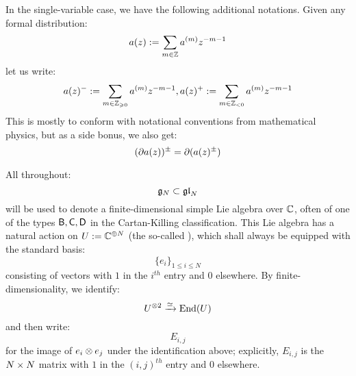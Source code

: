             In the single-variable case, we have the following additional notations. Given any formal distribution:
                $$a(z) := \sum_{m \in \mathbb{Z}} a^{(m)} z^{-m - 1}$$
            let us write:
                $$a(z)^- := \sum_{m \in \mathbb{Z}_{\geqslant 0}} a^{(m)} z^{-m - 1}, a(z)^+ := \sum_{m \in \mathbb{Z}_{< 0}} a^{(m)} z^{-m - 1}$$
            This is mostly to conform with notational conventions from mathematical physics, but as a side bonus, we also get:
                $$(\partial a(z))^{\pm} = \partial( a(z)^{\pm} )$$

            All throughout:
                $$\mathfrak{g}_N \subset \mathfrak{gl}_N$$
            will be used to denote a finite-dimensional simple Lie algebra over $\mathbb{C}$, often of one of the types $\mathsf{B}, \mathsf{C}, \mathsf{D}$ in the Cartan-Killing classification. This Lie algebra has a natural action on $U := \mathbb{C}^{\oplus N}$ (the so-called ), which shall always be equipped with the standard basis:
                $$\{e_i\}_{1 \leq i \leq N}$$
            consisting of vectors with $1$ in the $i^{th}$ entry and $0$ elsewhere. By finite-dimensionality, we identify:
                $$U^{\tensor 2} \xrightarrow[]{\cong} \End(U)$$
            and then write:
                $$E_{i, j}$$
            for the image of $e_i \tensor e_j$ under the identification above; explicitly, $E_{i, j}$ is the $N \x N$ matrix with $1$ in the $(i, j)^{th}$ entry and $0$ elsewhere.

    

    

    \begin{appendices}
        
    \end{appendices}
    
    \printbibliography

